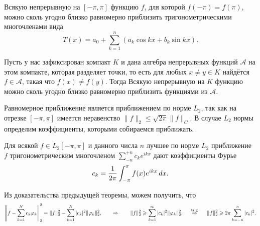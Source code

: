 \begin{to_thr}
    \label{thr_4.77}
    Всякую непрерывную на $[-\pi, \pi]$ функцию $f$, для которой $f(-\pi)=f(\pi)$, можно сколь угодно близко равномерно приблизить тригонометрическими многочленами вида
    \begin{equation*}
        T(x) = a_0 + \sum_{k=1}^{n} (a_k \cos kx + b_k \sin kx).
    \end{equation*}
\end{to_thr}

\begin{to_thr}
    Пусть у нас зафиксирован компакт $K$ и дана алгебра непрерывных функций $\mathcal A$ на этом компакте, которая разделяет точки, то есть для любых $x \neq y \in K$ найдётся $f \in \mathcal A$, такая что $f(x) \neq f(y)$. Тогда Всякую непрерывную на $K$ функцию можно сколь угодно близко равномерно приблизить функциями из $\mathcal A$.
\end{to_thr}

 Равномерное приближение является приближением по норме $L_2$, так как на отрезке $[-\pi, \pi]$ имеется неравенство $\|f\|_2 \leq \sqrt{2\pi} \|f\|_C$. В случае $L_2$ нормы определим коэффициенты, которыми собираемся приближать.

\begin{to_thr}
    Для всякой $f \in L_2[-\pi, \pi]$ и данного числа $n$ лучшее по норме $L_2$ приближение $f$ тригонометрическим многочленом $\sum_{-n}^{+n} c_k e^{ikx}$ дают коэффициенты Фурье
    \begin{equation*}
        c_k = \frac{1}{2\pi} \int_{-\pi}^{\pi} f(x) e^{ikx} \d x.
    \end{equation*}
\end{to_thr}


\begin{to_lem}
    Из доказательства предыдущей теоремы, можем получить, что
    \begin{equation*}
        \left\|f - \sum_{k=1}^N c_k \varphi_k \right\|_2^2 = 
        \|f\|_2^2 - \sum_{k=1}^{N} |c_k|^2 \|\varphi_k\|_2^2,
        \hspace{0.7 cm} \Rightarrow \hspace{0.7   cm}
        \|f\|_2^2 \geq  \sum_{k=1}^{\infty} |c_k|^2 \|\varphi_k\|^2_2,
        \hspace{0.5cm} \overset{\mathrm{trig}}{\Rightarrow}  \hspace{0.5cm}
        \|f\|_2^2 \geq 2\pi \sum_{k=-n}^n |c_k|^2.
    \end{equation*}
\end{to_lem}

